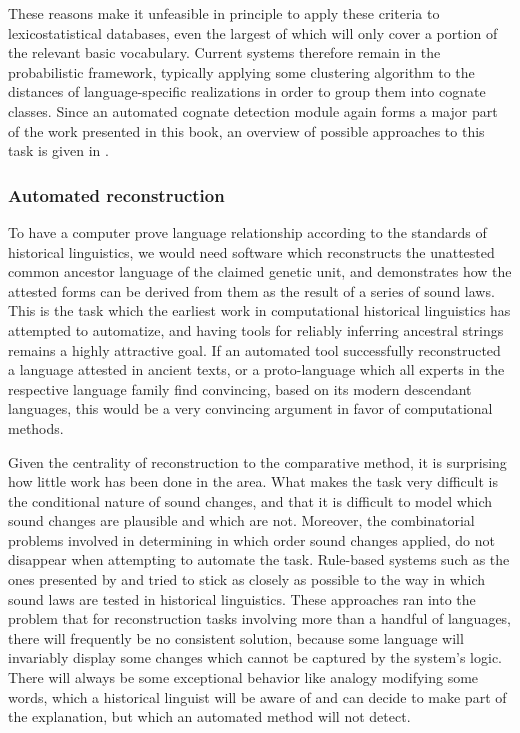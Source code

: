 These reasons make it unfeasible in principle to apply these criteria to lexicostatistical databases, even the largest of which will only cover a portion of the relevant basic vocabulary. Current systems therefore remain in the probabilistic framework, typically applying some clustering algorithm to the distances of language-specific realizations in order to group them into cognate classes. Since an automated cognate detection module again forms a major part of the work presented in this book, an overview of possible approaches to this task is given in .

\subsubsection{Automated reconstruction}
To have a computer prove language relationship according to the standards of historical linguistics, we would need software which reconstructs the unattested common ancestor language of the claimed genetic unit, and demonstrates how the attested forms can be derived from them as the result of a series of sound laws. This is the task which the earliest work in computational historical linguistics has attempted to automatize, and having tools for reliably inferring ancestral strings remains a highly attractive goal. If an automated tool successfully reconstructed a language attested in ancient texts, or a proto-language which all experts in the respective language family find convincing, based on its modern descendant languages, this would be a very convincing argument in favor of computational methods.

Given the centrality of reconstruction to the comparative method, it is surprising how little work has been done in the area. What makes the task very difficult is the conditional nature of sound changes, and that it is difficult to model which sound changes are plausible and which are not. Moreover, the combinatorial problems involved in determining in which order sound changes applied, do not disappear when attempting to automate the task. Rule-based systems such as the ones presented by \citet{hewson1974} and \citet{oakes2000} tried to stick as closely as possible to the way in which sound laws are tested in historical linguistics. These approaches ran into the problem that for reconstruction tasks involving more than a handful of languages, there will frequently be no consistent solution, because some language will invariably display some changes which cannot be captured by the system's logic. There will always be some exceptional behavior like analogy modifying some words, which a historical linguist 
will be aware of and can decide to make part of the explanation, but which an automated method will not detect.

